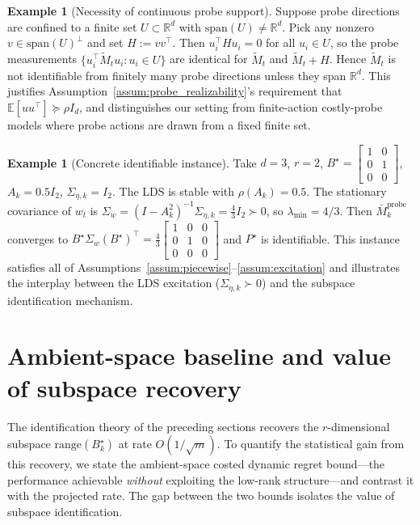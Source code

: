 \documentclass[12pt]{article}
\newcommand{\R}{\mathbb{R}}
\newcommand{\E}{\mathbb{E}}
\newcommand{\range}{\mathrm{range}}
\newcommand{\Span}{\mathrm{span}}
\newcommand{\bbm}{\begin{bmatrix}}
\newcommand{\ebm}{\end{bmatrix}}
\theoremstyle{plain}
\theoremstyle{definition}
\newtheorem{example}[theorem]{Example}
\begin{document}
\begin{example}[Necessity of continuous probe support]
\label{ex:finite_probes}
Suppose probe directions are confined to a finite set $U \subset \R^d$ with $\Span(U) \neq \R^d$. Pick any nonzero $v \in \Span(U)^\perp$ and set $H := vv^\top$. Then $u_i^\top H u_i = 0$ for all $u_i \in U$, so the probe measurements $\{u_i^\top \widetilde{M}_t u_i : u_i \in U\}$ are identical for $\widetilde{M}_t$ and $\widetilde{M}_t + H$. Hence $\widetilde{M}_t$ is not identifiable from finitely many probe directions unless they span $\R^d$. This justifies Assumption~\ref{assum:probe_realizability}'s requirement that $\E[uu^\top] \succeq \rho I_d$, and distinguishes our setting from finite-action costly-probe models \citep{elumar2025costly} where probe actions are drawn from a fixed finite set.
\end{example}

\begin{example}[Concrete identifiable instance]
\label{ex:concrete}
Take $d = 3$, $r = 2$, $B^\star = \bbm 1 & 0 \\ 0 & 1 \\ 0 & 0 \ebm$, $A_k = 0.5 I_2$, $\Sigma_{\eta,k} = I_2$. The LDS is stable with $\rho(A_k) = 0.5$. The stationary covariance of $w_t$ is $\Sigma_w = (I - A_k^2)^{-1}\Sigma_{\eta,k} = \frac{4}{3}I_2 \succ 0$, so $\lambda_{\min} = 4/3$. Then $\bar{M}_k^{\mathrm{probe}}$ converges to $B^\star \Sigma_w (B^\star)^\top = \frac{4}{3}\bbm 1 & 0 & 0 \\ 0 & 1 & 0 \\ 0 & 0 & 0 \ebm$ and $P^\star$ is identifiable. This instance satisfies all of Assumptions~\ref{assum:piecewise}--\ref{assum:excitation} and illustrates the interplay between the LDS excitation ($\Sigma_{\eta,k} \succ 0$) and the subspace identification mechanism.
\end{example}


\section{Ambient-space baseline and value of subspace recovery}
\label{sec:ambient_reference}

The identification theory of the preceding sections recovers the $r$-dimensional subspace $\range(B_k^\star)$ at rate $O(1/\sqrt{m})$. To quantify the statistical gain from this recovery, we state the ambient-space costed dynamic regret bound---the performance achievable \emph{without} exploiting the low-rank structure---and contrast it with the projected rate. The gap between the two bounds isolates the value of subspace identification.
\end{document}
